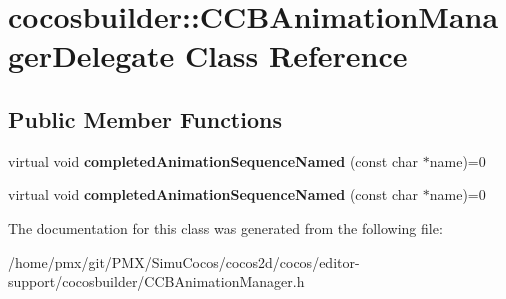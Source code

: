 \hypertarget{classcocosbuilder_1_1CCBAnimationManagerDelegate}{}\section{cocosbuilder\+:\+:C\+C\+B\+Animation\+Manager\+Delegate Class Reference}
\label{classcocosbuilder_1_1CCBAnimationManagerDelegate}
\subsection*{Public Member Functions}
\begin{DoxyCompactItemize}
\item 
\mbox{\label{classcocosbuilder_1_1CCBAnimationManagerDelegate_a9e2d70e7e68a920afe71a4ba9a05627a}} 
virtual void {\bfseries completed\+Animation\+Sequence\+Named} (const char $\ast$name)=0
\item 
\mbox{\label{classcocosbuilder_1_1CCBAnimationManagerDelegate_a9e2d70e7e68a920afe71a4ba9a05627a}} 
virtual void {\bfseries completed\+Animation\+Sequence\+Named} (const char $\ast$name)=0
\end{DoxyCompactItemize}


The documentation for this class was generated from the following file\+:\begin{DoxyCompactItemize}
\item 
/home/pmx/git/\+P\+M\+X/\+Simu\+Cocos/cocos2d/cocos/editor-\/support/cocosbuilder/C\+C\+B\+Animation\+Manager.\+h\end{DoxyCompactItemize}
